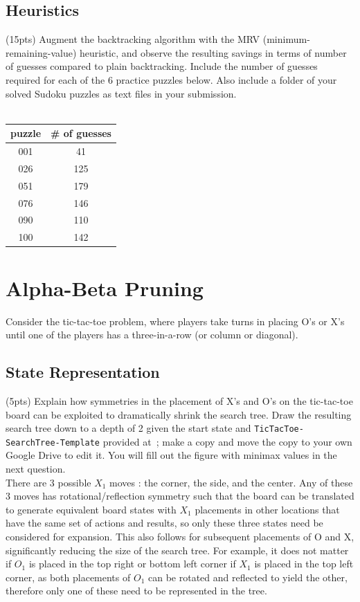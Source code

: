 \documentclass{article}
\begin{document}
\subsection{Heuristics} (15pts) Augment the backtracking algorithm with the MRV (minimum-remaining-value) heuristic, and observe the resulting savings in terms of number of guesses compared to plain backtracking. Include the number of guesses required for each of the 6 practice puzzles below. Also include a folder of your solved Sudoku puzzles as text files in your submission.\\
\\
\begin{center}
\begin{tabular}{c||c}
    puzzle & \# of guesses \\ \hline
    001 & 41 \\ \hline
    026 & 125 \\ \hline
    051 & 179 \\ \hline
    076 & 146 \\ \hline
    090 & 110 \\ \hline
    100 & 142 \\ \hline
\end{tabular}
\end{center}

\section{Alpha-Beta Pruning} Consider the tic-tac-toe problem, where players take turns in placing O's or X's until one of the players has a three-in-a-row (or column or diagonal).

\subsection{State Representation} (5pts) Explain how symmetries in the placement of X's and O's on the tic-tac-toe board can be exploited to dramatically shrink the search tree. Draw the resulting search tree down to a depth of 2 given the start state and \texttt{TicTacToe-SearchTree-Template} provided at~\href{https://docs.google.com/drawings/d/1l1VsrFXYuovPLV1bjBi_lMqEekN98_nCWesdhMv0kmo/edit?usp=sharing}{\color{blue}{HWs Public/HW2}}; make a copy and move the copy to your own Google Drive to edit it. You will fill out the figure with minimax values in the next question.\\

There are 3 possible $X_1$ moves : the corner, the side, and the center. Any of these 3 moves has rotational/reflection symmetry such that the board can be translated to generate equivalent board states with $X_1$ placements in other locations that have the same set of actions and results, so only these three states need be considered for expansion. This also follows for subsequent placements of O and X, significantly reducing the size of the search tree. For example, it does not matter if $O_1$ is placed in the top right or bottom left corner if $X_1$ is placed in the top left corner, as both placements of $O_1$ can be rotated and reflected to yield the other, therefore only one of these need to be represented in the tree. \\
\end{document}
